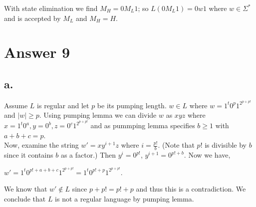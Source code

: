 \documentclass[12pt]{article}
\begin{document}
\qquad With state elimination we find $M_H = 0M_L1$; so $L(0M_L1) = 0w1$ where $w \in \Sigma^*$ and is accepted by $M_L$ and $M_H = H$.

\section*{Answer 9}
\subsection*{a.}

\qquad Assume $L$ is regular and let $p$ be its pumping length. $w \in L$ where $w = 1^t0^p1^{2^{p+p!}}$ and $|w|\geq p$. Using pumping lemma we can divide $w$ as $xyz$ where $x=1^t0^a, y=0^b, z=0^c1^{2^{p+p!}}$ and as pummping lemma specifies $b \geq 1$ with $a+b+c = p$.\\

\qquad Now, examine the string $w' = xy^{i+1}z$ where $i = \frac{p!}{b}$. (Note that $p!$ is divisible by $b$ since it contains $b$ as a factor.) Then $y^i = 0^{p!}$, $y^{i+1} = 0^{p!+b}$. Now we have,
\begin{center}
  $w' = 1^t0^{p!+a+b+c}1^{2^{p+p!}} = 1^t0^{p!+p}1^{2^{p+p!}}$.
\end{center}

\qquad We know that $w' \notin L$ since $p+p! = p!+p$ and thus this is a contradiction. We conclude that $L$ is not a regular language by pumping lemma.
\end{document}
